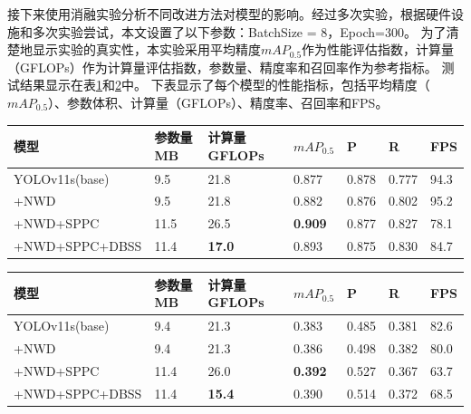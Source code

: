 接下来使用消融实验分析不同改进方法对模型的影响。经过多次实验，根据硬件设施和多次实验尝试，本文设置了以下参数：BatchSize = 8，Epoch=300。 为了清楚地显示实验的真实性，本实验采用平均精度$mAP_{0.5}$作为性能评估指数，计算量（GFLOPs）作为计算量评估指数，参数量、精度率和召回率作为参考指标。 测试结果显示在表\ref{tab:ablation_studies_tt100k}和\ref{tab:ablation_studies_vd}中。 下表显示了每个模型的性能指标，包括平均精度（$mAP_{0.5}$）、参数体积、计算量（GFLOPs）、精度率、召回率和FPS。

\begin{table}[htbp]
    \centering
    \captionsetup{font=footnotesize}
    \label{tab:ablation_studies_tt100k}
    \begin{tabular}{p{}p{}p{}p{}p{}p{}p{}}
        \toprule
        模型       & 参数量 MB & 计算量 GFLOPs & $mAP_{0.5}$   & P     & R     & FPS \\ 
        \midrule
        YOLOv11s(base) & 9.5           & 21.8         & 0.877          & 0.878  & 0.777 & 94.3 \\
        +NWD           & 9.5           & 21.8         & 0.882          & 0.876  & 0.802 & 95.2 \\
        +NWD+SPPC      & 11.5          & 26.5         & \textbf{0.909} & 0.877  & 0.827 & 78.1 \\
        +NWD+SPPC+DBSS & 11.4          & \textbf{17.0} & 0.893          & 0.875  & 0.830 & 84.7 \\
        \bottomrule
    \end{tabular}
\end{table}

\begin{table}[htbp]
    \centering
    \captionsetup{font=footnotesize}
    \label{tab:ablation_studies_vd}
    \begin{tabular}{p{}p{}p{}p{}p{}p{}p{}}
        \toprule
        模型       & 参数量 MB & 计算量 GFLOPs & $mAP_{0.5}$   & P     & R     & FPS \\ 
        \midrule
        YOLOv11s(base) & 9.4           & 21.3          & 0.383          & 0.485  & 0.381 & 82.6 \\
        +NWD           & 9.4           & 21.3          & 0.386          & 0.498  & 0.382 & 80.0 \\
        +NWD+SPPC      & 11.4          & 26.0          & \textbf{0.392} & 0.527  & 0.367 & 63.7 \\
        +NWD+SPPC+DBSS & 11.4          & \textbf{15.4} & 0.390 & 0.514  & 0.372 & 68.5 \\
        \bottomrule
    \end{tabular}
\end{table}

